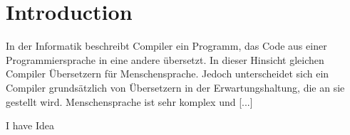 \chapter{Introduction}
In der Informatik beschreibt Compiler ein Programm, das Code aus einer Programmiersprache in eine andere übersetzt. In dieser Hinsicht gleichen Compiler Übersetzern für Menschensprache.
Jedoch unterscheidet sich ein Compiler grundsätzlich von Übersetzern in der Erwartungshaltung, die an sie gestellt wird. Menschensprache ist sehr komplex und [...]

I have Idea
